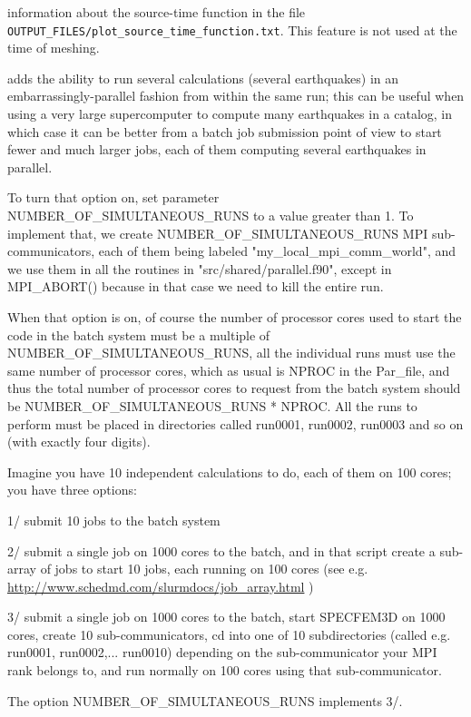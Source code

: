 \begin{description}
information about the source-time function in the file \texttt{OUTPUT\_FILES/plot\_source\_time\_function.txt}.
This feature is not used at the time of meshing.
%
\item [{\texttt{NUMBER\_OF\_SIMULTANEOUS\_RUNS}}] adds the ability to run several calculations (several earthquakes)
in an embarrassingly-parallel fashion from within the same run;
this can be useful when using a very large supercomputer to compute
many earthquakes in a catalog, in which case it can be better from
a batch job submission point of view to start fewer and much larger jobs,
each of them computing several earthquakes in parallel.

To turn that option on, set parameter NUMBER\_OF\_SIMULTANEOUS\_RUNS to a value greater than 1.
To implement that, we create NUMBER\_OF\_SIMULTANEOUS\_RUNS MPI sub-communicators,
each of them being labeled "my\_local\_mpi\_comm\_world", and we use them
in all the routines in "src/shared/parallel.f90", except in MPI\_ABORT() because in that case
we need to kill the entire run.

When that option is on, of course the number of processor cores used to start
the code in the batch system must be a multiple of NUMBER\_OF\_SIMULTANEOUS\_RUNS,
all the individual runs must use the same number of processor cores,
which as usual is NPROC in the Par\_file,
and thus the total number of processor cores to request from the batch system
should be NUMBER\_OF\_SIMULTANEOUS\_RUNS * NPROC.
All the runs to perform must be placed in directories called run0001, run0002, run0003 and so on
(with exactly four digits).

Imagine you have 10 independent calculations to do, each of them on 100 cores; you have three options:

1/ submit 10 jobs to the batch system

2/ submit a single job on 1000 cores to the batch, and in that script create a sub-array of jobs to start 10 jobs,
each running on 100 cores (see e.g. \url{http://www.schedmd.com/slurmdocs/job_array.html} )

3/ submit a single job on 1000 cores to the batch, start SPECFEM3D on 1000 cores, create 10 sub-communicators,
cd into one of 10 subdirectories (called e.g. run0001, run0002,... run0010) depending on the sub-communicator
your MPI rank belongs to, and run normally on 100 cores using that sub-communicator.

The option NUMBER\_OF\_SIMULTANEOUS\_RUNS implements 3/.


\end{description}

